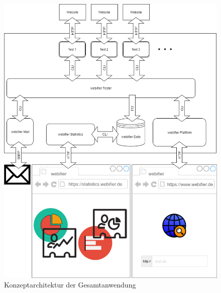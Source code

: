 \begin{figure}[H]
	\centering
	\includegraphics[width=\textwidth]{images/anwendung-konzept}
	\caption{Konzeptarchitektur der Gesamtanwendung}
	\label{fig:anwendung-konzept}
\end{figure}

